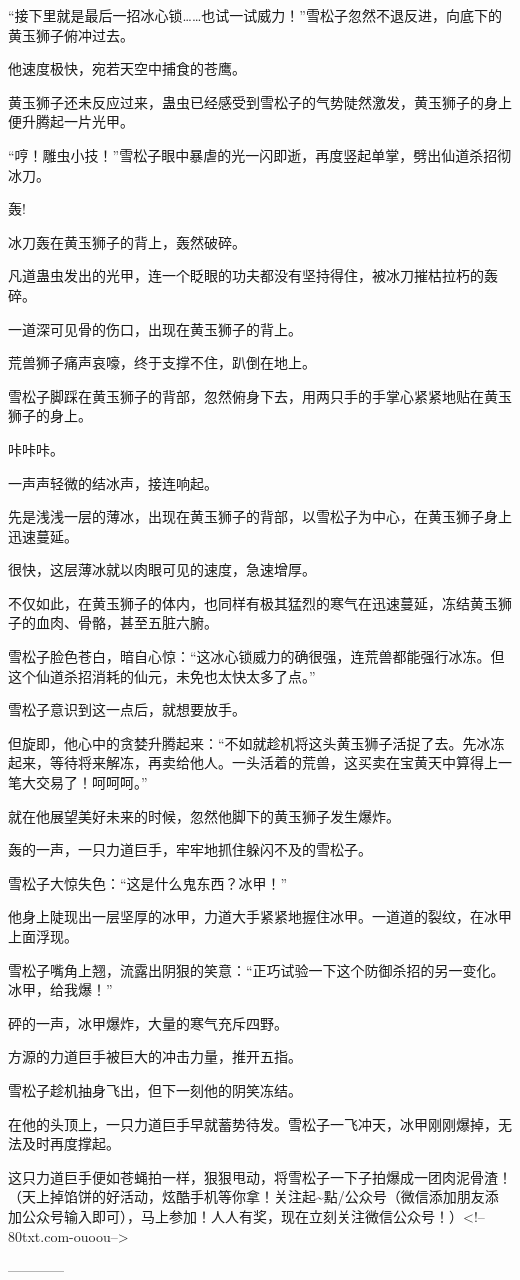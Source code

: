 \begin{this_body}
“接下里就是最后一招冰心锁……也试一试威力！”雪松子忽然不退反进，向底下的黄玉狮子俯冲过去。

他速度极快，宛若天空中捕食的苍鹰。

黄玉狮子还未反应过来，蛊虫已经感受到雪松子的气势陡然激发，黄玉狮子的身上便升腾起一片光甲。

“哼！雕虫小技！”雪松子眼中暴虐的光一闪即逝，再度竖起单掌，劈出仙道杀招彻冰刀。

轰!

冰刀轰在黄玉狮子的背上，轰然破碎。

凡道蛊虫发出的光甲，连一个眨眼的功夫都没有坚持得住，被冰刀摧枯拉朽的轰碎。

一道深可见骨的伤口，出现在黄玉狮子的背上。

荒兽狮子痛声哀嚎，终于支撑不住，趴倒在地上。

雪松子脚踩在黄玉狮子的背部，忽然俯身下去，用两只手的手掌心紧紧地贴在黄玉狮子的身上。

咔咔咔。

一声声轻微的结冰声，接连响起。

先是浅浅一层的薄冰，出现在黄玉狮子的背部，以雪松子为中心，在黄玉狮子身上迅速蔓延。

很快，这层薄冰就以肉眼可见的速度，急速增厚。

不仅如此，在黄玉狮子的体内，也同样有极其猛烈的寒气在迅速蔓延，冻结黄玉狮子的血肉、骨骼，甚至五脏六腑。

雪松子脸色苍白，暗自心惊：“这冰心锁威力的确很强，连荒兽都能强行冰冻。但这个仙道杀招消耗的仙元，未免也太快太多了点。”

雪松子意识到这一点后，就想要放手。

但旋即，他心中的贪婪升腾起来：“不如就趁机将这头黄玉狮子活捉了去。先冰冻起来，等待将来解冻，再卖给他人。一头活着的荒兽，这买卖在宝黄天中算得上一笔大交易了！呵呵呵。”

就在他展望美好未来的时候，忽然他脚下的黄玉狮子发生爆炸。

轰的一声，一只力道巨手，牢牢地抓住躲闪不及的雪松子。

雪松子大惊失色：“这是什么鬼东西？冰甲！”

他身上陡现出一层坚厚的冰甲，力道大手紧紧地握住冰甲。一道道的裂纹，在冰甲上面浮现。

雪松子嘴角上翘，流露出阴狠的笑意：“正巧试验一下这个防御杀招的另一变化。冰甲，给我爆！”

砰的一声，冰甲爆炸，大量的寒气充斥四野。

方源的力道巨手被巨大的冲击力量，推开五指。

雪松子趁机抽身飞出，但下一刻他的阴笑冻结。

在他的头顶上，一只力道巨手早就蓄势待发。雪松子一飞冲天，冰甲刚刚爆掉，无法及时再度撑起。

这只力道巨手便如苍蝇拍一样，狠狠甩动，将雪松子一下子拍爆成一团肉泥骨渣！（天上掉馅饼的好活动，炫酷手机等你拿！关注起\~{}點/公众号（微信添加朋友添加公众号输入即可），马上参加！人人有奖，现在立刻关注微信公众号！）<!--80txt.com-ouoou-->

------------

\end{this_body}


